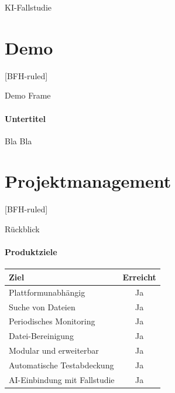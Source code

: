 \documentclass[
    ngerman,%
    authorontitle=true,
]{bfhbeamer}
\begin{document}
    \begin{frame}{KI-Fallstudie}
    \end{frame}

    \section{Demo}\label{sec:demo}
    [BFH-ruled]
    \frame{\sectionpage}

    \begin{frame}{Demo Frame}
        \framesubtitle{Untertitel}
        Bla Bla
    \end{frame}

    \section{Projektmanagement}\label{sec:projektmanagement}
    [BFH-ruled]
    \frame{\sectionpage}

    \begin{frame}{Rückblick}
        \framesubtitle{Produktziele}
        {
            \centering
            \begin{tabular}{l|c}
                \textbf{Ziel}                & \textbf{Erreicht} \\
                \hline
                Plattformunabhängig          & Ja                \\
                Suche von Dateien            & Ja                \\
                Periodisches Monitoring      & Ja                \\
                Datei-Bereinigung            & Ja                \\
                Modular und erweiterbar      & Ja                \\
                Automatische Testabdeckung   & Ja                \\
                AI-Einbindung mit Fallstudie & Ja                \\
            \end{tabular}\par
        }

    \end{frame}
\end{document}
